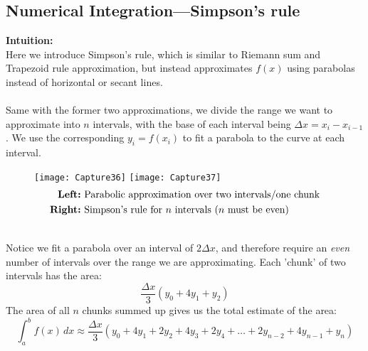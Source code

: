 \documentclass{report}
\begin{document}
\subsection{Numerical Integration---Simpson's rule} %
\textbf{Intuition:}\\
Here we introduce Simpson's rule, which is similar to Riemann sum and Trapezoid rule 
approximation, but instead approximates $f(x)$ using parabolas instead of horizontal
or secant lines.\\
\vspace{1mm}\\
Same with the former two approximations, we divide the range we want to approximate 
into $n$ intervals, with the base of each interval being $\Delta x=x_i-x_{i-1}$.
We use the corresponding $y_i=f(x_i)$ to fit a parabola to the curve at each interval.	
\begin{figure}[h]
\texttt{[image: Capture36]}
\texttt{[image: Capture37]}\\
\centering
\begin{align*}
\text{\textbf{Left:}}&\text{ Parabolic approximation over two intervals/one chunk}\\
\text{\textbf{Right:}}&\text{ Simpson's rule for $n$ intervals ($n$ must be even)}
\end{align*}
\end{figure}\\
Notice we fit a parabola over an interval of $2\Delta x$, and therefore
require an \textit{even} number of intervals over the range we are approximating. Each 'chunk' of two intervals has the area:
\begin{equation*}
\frac{\Delta x}{3}(y_0+4y_1+y_2)
\end{equation*}
The area of all $n$ chunks summed up gives us the total estimate of the area:
\begin{equation*}
\int_a^bf(x)\,dx\approx \frac{\Delta x}{3}(y_0+4y_1+2y_2
+4y_3+2y_4+\ldots+2y_{n-2}+4y_{n-1}+y_n) 
\end{equation*}
\newpage
\end{document}
